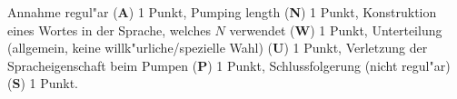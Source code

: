 \begin{bewertung}
Annahme regul"ar ({\bf A}) 1 Punkt,
Pumping length ({\bf N}) 1 Punkt,
Konstruktion eines Wortes in der Sprache, welches $N$ verwendet ({\bf W})
1 Punkt,
Unterteilung (allgemein, keine willk"urliche/spezielle Wahl) ({\bf U}) 1 Punkt,
Verletzung der Spracheigenschaft beim Pumpen ({\bf P}) 1 Punkt,
Schluss\-folgerung (nicht regul"ar) ({\bf S}) 1 Punkt.
\end{bewertung}
 
